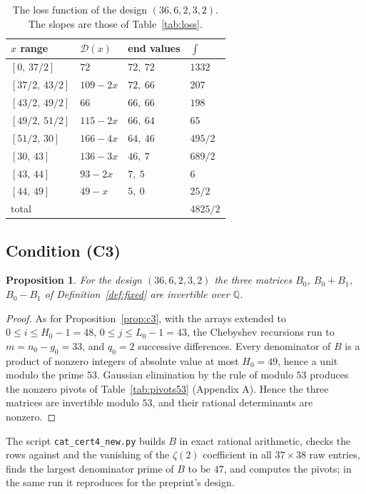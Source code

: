 \documentclass[11pt]{article}
\newtheorem{proposition}[theorem]{Proposition}
\theoremstyle{definition}
\newcommand{\Dl}{\mathcal{D}}
\begin{document}
\begin{table}[ht]
\centering
\begin{tabular}{llll}
\toprule
$x$ range & $\Dl(x)$ & end values & $\int$ \\
\midrule
$[0,\,37/2]$ & $72$ & $72,\ 72$ & $1332$\\
$[37/2,\,43/2]$ & $109-2x$ & $72,\ 66$ & $207$\\
$[43/2,\,49/2]$ & $66$ & $66,\ 66$ & $198$\\
$[49/2,\,51/2]$ & $115-2x$ & $66,\ 64$ & $65$\\
$[51/2,\,30]$ & $166-4x$ & $64,\ 46$ & $495/2$\\
$[30,\,43]$ & $136-3x$ & $46,\ 7$ & $689/2$\\
$[43,\,44]$ & $93-2x$ & $7,\ 5$ & $6$\\
$[44,\,49]$ & $49-x$ & $5,\ 0$ & $25/2$\\
\midrule
total & & & $4825/2$\\
\bottomrule
\end{tabular}
\caption{The loss function of the design $(36,6,2,3,2)$. The slopes are those of Table~\ref{tab:loss}.}\label{tab:loss36}
\end{table}

\subsection{Condition (C3)}

\begin{proposition}\label{prop:c3b}
For the design $(36,6,2,3,2)$ the three matrices $B_0$, $B_0+B_1$, $B_0-B_1$ of Definition~\ref{def:fixed} are invertible over $\mathbb Q$.
\end{proposition}

\begin{proof}
As for Proposition~\ref{prop:c3}, with the arrays extended to $0\le i\le H_0-1=48$, $0\le j\le L_0-1=43$, the Chebyshev recursions run to $m=n_0-g_0=33$, and $q_0=2$ successive differences. Every denominator of $B$ is a product of nonzero integers of absolute value at most $H_0=49$, hence a unit modulo the prime $53$. Gaussian elimination by the rule of \cite[Sec.~4.4]{OAI} modulo $53$ produces the nonzero pivots of Table~\ref{tab:pivots53} (Appendix A). Hence the three matrices are invertible modulo $53$, and their rational determinants are nonzero.
\end{proof}

The script \texttt{cat\_cert4\_new.py} builds $B$ in exact rational arithmetic, checks the rows against \cite[Eq.~(3)]{OAI} and the vanishing of the $\zeta(2)$ coefficient in all $37\times38$ raw entries, finds the largest denominator prime of $B$ to be $47$, and computes the pivots; in the same run it reproduces \cite[Table~1]{OAI} for the preprint's design.
\end{document}
